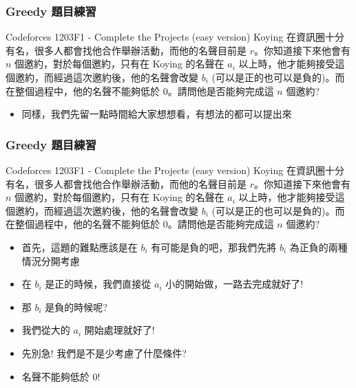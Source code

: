 \documentclass[aspectratio=169]{beamer}
\begin{document}
\begin{frame}
\frametitle{Greedy 題目練習}
    \begin{block}{Codeforces 1203F1 - Complete the Projects (easy version)}
        Koying 在資訊圈十分有名，很多人都會找他合作舉辦活動，而他的名聲目前是 $r$。你知道接下來他會有 $n$ 個邀約，對於每個邀約，只有在 Koying 的名聲在 $a_i$ 以上時，他才能夠接受這個邀約，而經過這次邀約後，他的名聲會改變 $b_i$ (可以是正的也可以是負的)。而在整個過程中，他的名聲不能夠低於 $0$。請問他是否能夠完成這 $n$ 個邀約?
    \end{block}
    \begin{itemize}
        \item<2-> 同樣，我們先留一點時間給大家想想看，有想法的都可以提出來
    \end{itemize}
\end{frame}

\begin{frame}
\frametitle{Greedy 題目練習}
    \begin{block}{Codeforces 1203F1 - Complete the Projects (easy version)}
        Koying 在資訊圈十分有名，很多人都會找他合作舉辦活動，而他的名聲目前是 $r$。你知道接下來他會有 $n$ 個邀約，對於每個邀約，只有在 Koying 的名聲在 $a_i$ 以上時，他才能夠接受這個邀約，而經過這次邀約後，他的名聲會改變 $b_i$ (可以是正的也可以是負的)。而在整個過程中，他的名聲不能夠低於 $0$。請問他是否能夠完成這 $n$ 個邀約?
    \end{block}
    \begin{itemize}
        \item<1-> 首先，這題的難點應該是在 $b_i$ 有可能是負的吧，那我們先將 $b_i$ 為正負的兩種情況分開考慮
        \item<2-> 在 $b_i$ 是正的時候，我們直接從 $a_i$ 小的開始做，一路去完成就好了!
        \item<3-> 那 $b_i$ 是負的時候呢? 
        \item<4-> 我們從大的 $a_i$ 開始處理就好了!
        \item<5-> 先別急! 我們是不是少考慮了什麼條件?
        \item<6-> 名聲不能夠低於 $0$!
    \end{itemize}
\end{frame}
\end{document}
